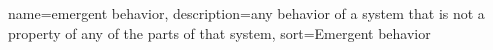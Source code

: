{
  name={emergent behavior},
  description={any behavior of a system that is not a property of any of the parts of that system},
  sort=Emergent behavior
}